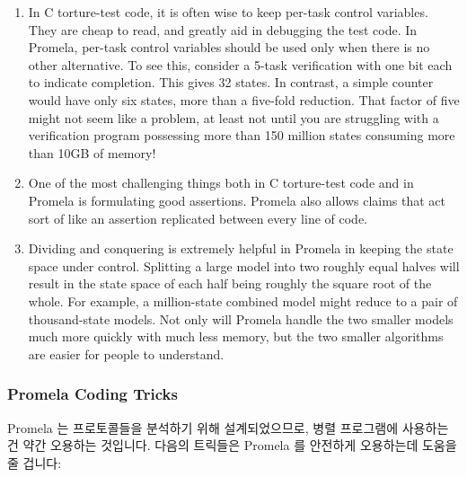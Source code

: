 \begin{enumerate}
\item	In C torture-test code, it is often wise to keep per-task control
	variables.  They are cheap to read, and greatly aid in debugging the
	test code.  In Promela, per-task control variables should be used
	only when there is no other alternative.  To see this, consider
	a 5-task verification with one bit each to indicate completion.
	This gives 32 states.  In contrast, a simple counter would have
	only six states, more than a five-fold reduction.  That factor
	of five might not seem like a problem, at least not until you
	are struggling with a verification program possessing more than
	150 million states consuming more than 10GB of memory!
\item	One of the most challenging things both in C torture-test code and
	in Promela is formulating good assertions.  Promela also allows
	 claims that act sort of like an assertion replicated
	between every line of code.
\item	Dividing and conquering is extremely helpful in Promela in keeping
	the state space under control.  Splitting a large model into two
	roughly equal halves will result in the state space of each
	half being roughly the square root of the whole.
	For example, a million-state combined model might reduce to a
	pair of thousand-state models.
	Not only will Promela handle the two smaller models much more
	quickly with much less memory, but the two smaller algorithms
	are easier for people to understand.
\fi
\end{enumerate}


\subsubsection{Promela Coding Tricks}
\label{sec:formal:Promela Coding Tricks}

Promela 는 프로토콜들을 분석하기 위해 설계되었으므로, 병렬 프로그램에
사용하는건 약간 오용하는 것입니다.
다음의 트릭들은 Promela 를 안전하게 오용하는데 도움을 줄 겁니다:
\iffalse

Promela was designed to analyze protocols, so using it on parallel programs
is a bit abusive.
The following tricks can help you to abuse Promela safely:
\fi

